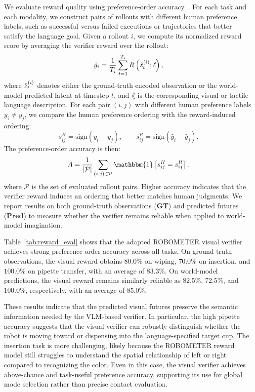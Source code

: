 We evaluate reward quality using preference-order accuracy~\cite{tian2026position}. For each task and each modality, we construct pairs of rollouts with different human preference labels, such as successful versus failed executions or trajectories that better satisfy the language goal. Given a rollout $i$, we compute its normalized reward score by averaging the verifier reward over the rollout:
\begin{equation}
\hat{y}_i
=
\frac{1}{T_i}
\sum_{t=1}^{T_i}
R
\left(
    \hat{z}_{t}^{(i)};
    \ell
\right),
\label{eq:preference_reward_score}
\end{equation}
where $\hat{z}_{t}^{(i)}$ denotes either the ground-truth encoded observation or the world-model-predicted latent at timestep $t$, and $\lang$ is the corresponding visual or tactile language description. For each pair $(i,j)$ with different human preference labels $y_i \neq y_j$, we compare the human preference ordering with the reward-induced ordering:
\begin{equation}
s^{H}_{ij}
=
\mathrm{sign}(y_i-y_j),
\qquad
s^{R}_{ij}
=
\mathrm{sign}(\hat{y}_i-\hat{y}_j).
\label{eq:preference_signs}
\end{equation}
The preference-order accuracy is then:
\begin{equation}
A
=
\frac{1}{|\mathcal{P}|}
\sum_{(i,j)\in\mathcal{P}}
\mathbbm{1}
\left[
s^{H}_{ij}=s^{R}_{ij}
\right],
\label{eq:preference_order_accuracy}
\end{equation}
where $\mathcal{P}$ is the set of evaluated rollout pairs. Higher accuracy indicates that the verifier reward induces an ordering that better matches human judgments. We report results on both ground-truth observations (\textbf{GT}) and predicted futures (\textbf{Pred}) to measure whether the verifier remains reliable when applied to world-model imagination.

Table~\ref{tab:reward_eval} shows that the adapted ROBOMETER visual verifier achieves strong preference-order accuracy across all tasks. On ground-truth observations, the visual reward obtains $80.0\%$ on wiping, $70.0\%$ on insertion, and $100.0\%$ on pipette transfer, with an average of $83.3\%$. On world-model predictions, the visual reward remains similarly reliable as $82.5\%$, $72.5\%$, and $100.0\%$, respectively, with an average of $85.0\%$.

These results indicate that the predicted visual futures preserve the semantic information needed by the VLM-based verifier. In particular, the high pipette accuracy suggests that the visual verifier can robustly distinguish whether the robot is moving toward or dispensing into the language-specified target cup. The insertion task is more challenging, likely because the ROBOMETER reward model still struggles to understand the spatial relationship of left or right compared to recognizing the color. Even in this case, the visual verifier achieves above-chance and task-useful preference accuracy, supporting its use for global mode selection rather than precise contact evaluation.

